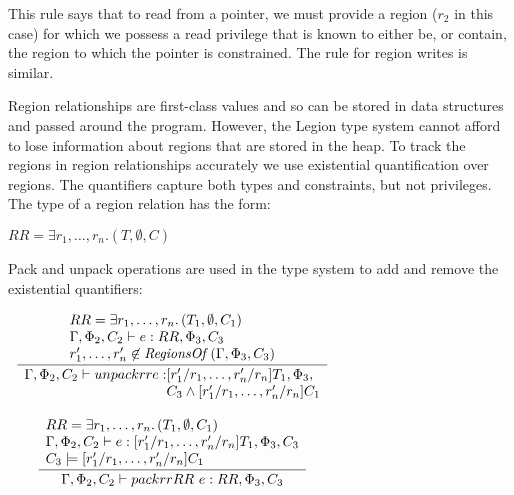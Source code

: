 This rule says that to read from a pointer, we must 
provide a region ($r_2$ in this case) for which we possess a read privilege that 
is known to either be, or contain, the region to which the pointer is
constrained.  The rule for region writes is similar.

Region relationships are first-class values and so can be stored in data structures
and passed around the program.  However, the Legion type
system cannot afford to lose information about regions that are stored
in the heap.  To track the regions
in region relationships accurately we use existential quantification
over regions.  The quantifiers capture both types and constraints, but 
not privileges.  The type of a region relation has the form:
\begin{center}
$RR = \exists r_1, \ldots, r_n.\left(T, \emptyset, C\right)$
\end{center}
Pack and unpack operations are used in the type system
to add and remove the existential quantifiers:
\begin{center}
{\small
\begin{math}
\begin{array}{c}
\infrule{
\begin{array}{l}
RR = \exists r_1, \ldots, r_n.\left(T_1, \emptyset, C_1\right) \\
\Gamma, \Phi_2, C_2 \vdash e : RR, \Phi_3, C_3  \\
r'_1, \ldots, r'_n \not\in \mathit{RegionsOf}\left(\Gamma, \Phi_3, C_3\right)
\end{array}
}{
\begin{array}{l@{}l}
\Gamma, \Phi_2, C_2 \vdash unpackrr{ }e :  & [r'_1/r_1,\ldots,r'_n/r_n]T_1, \Phi_3, \\
& C_3 \wedge [r'_1/r_1,\ldots,r'_n/r_n]C_1
\end{array}
}
\\
\\
\infrule{
\begin{array}{l}
RR = \exists r_1, \ldots, r_n.\left(T_1, \emptyset, C_1\right) \\
\Gamma, \Phi_2, C_2 \vdash e : [r'_1/r_1,\ldots,r'_n/r_n]T_1, \Phi_3, C_3 \\
C_3 \models [r'_1/r_1,\ldots,r'_n/r_n]C_1
\end{array}
}{
\begin{array}{l}
\Gamma, \Phi_2, C_2 \vdash packrr{ }RR\mbox{ }e : RR, \Phi_3, C_3 \\
\end{array}
}
\end{array}
\end{math}
}
\end{center}
